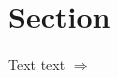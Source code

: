 \documentclass{article}
\begin{document}
\section{Section}
Text \cite{knuth_fa} text $\Rightarrow$

\printbibliography
\end{document}
